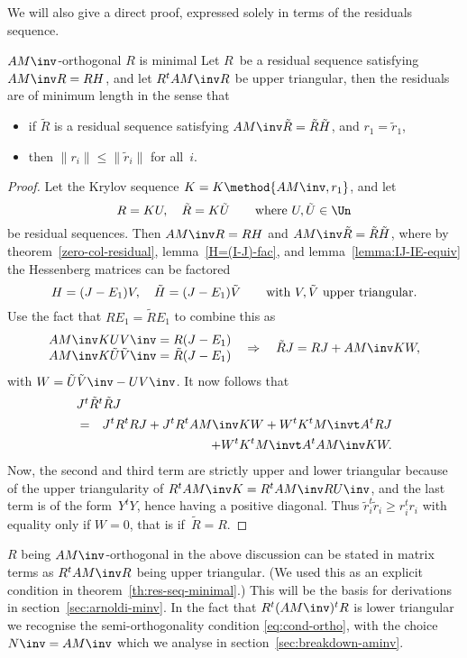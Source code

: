 We will also give a direct proof, expressed solely in terms of
the residuals sequence.

\begin{ttheorem}{$AM\inv$-orthogonal $R$ is minimal}
\label{th:res-seq-minimal}
Let $R$~be a residual sequence
satisfying $AM\inv R=RH$, and let $R^tAM\inv R$ be upper triangular,
then the residuals are of minimum length in the sense that
\begin{itemize}
\item if $\tilde R$ is a residual sequence satisfying
$AM\inv\tilde R=\tilde R\tilde H$, and $r_1=\tilde r_1$,
\item then $\|r_i\|\leq\|\tilde r_i\|$ for all~$i$.
\end{itemize}
\end{ttheorem}
\begin{proof}
Let the Krylov sequence $K=K\method{AM\inv,r_1}$,
and let 
 \[ R=KU,\quad\tilde R=K\tilde U \qquad\hbox{where $U,\tilde U\in \Un$} \]
be residual sequences.
Then $AM\inv R=RH$ and $AM\inv\tilde R=\tilde R\tilde H$, where 
by theorem~\ref{zero-col-residual}, lemma~\ref{H=(I-J)-fac},
and lemma~\ref{lemma:IJ-IE-equiv}
the Hessenberg matrices can be factored
 \[ H=(J-E_1)V,\quad \tilde H=(J-E_1)\tilde V
                \qquad\hbox{with $V,\tilde V$ upper triangular}. \]
Use the fact that $RE_1=\tilde RE_1$ to combine this as
 \[ \begin{matrix}AM\inv KUV\inv=R(J-E_1)\cr AM\inv K\tilde U\tilde V\inv
             =\tilde R(J-E_1)\cr\end{matrix}
    \quad\Rightarrow\quad \tilde RJ=RJ+AM\inv KW, \]
with $W=\tilde U\tilde V\inv -UV\inv$.
It now follows that
\begin{eqnarray*}
    \rlap{$J^t\tilde R^t\tilde RJ$}\\
    &=&J^tR^tRJ+
    J^tR^tAM\inv KW+W^tK^tM\invt A^tRJ\\
    &&+W^tK^tM\invt A^tAM\inv KW.
\end{eqnarray*}
Now, the second and third term are strictly upper and lower
triangular because of the upper triangularity
of $R^tAM\inv K=R^tAM\inv RU\inv$, and the last
term is of the form~$Y^tY$, hence having a positive diagonal. 
Thus $\tilde r_i^t\tilde r_i\geq r_i^tr_i$ with equality
only if $W=0$, that is if~$\tilde R=R$.
\end{proof}

\begin{truth}
\begin{remark}\label{lemma:ramr-uptri}
$R$ being $AM\inv$-orthogonal in the above discussion
can be stated in matrix terms as $R^tAM\inv R$ being upper triangular.
(We used this as an explicit condition in theorem~\ref{th:res-seq-minimal}.)
This will be the basis for derivations in section~\ref{sec:arnoldi-minv}.
In the fact that $R^t(AM\inv)^tR$ is lower triangular we recognise
the semi-orthogonality condition \eqref{eq:cond-ortho}, with the choice
$N\inv=AM\inv$ which we analyse in section~\ref{sec:breakdown-aminv}.
\end{remark}
\end{truth}

